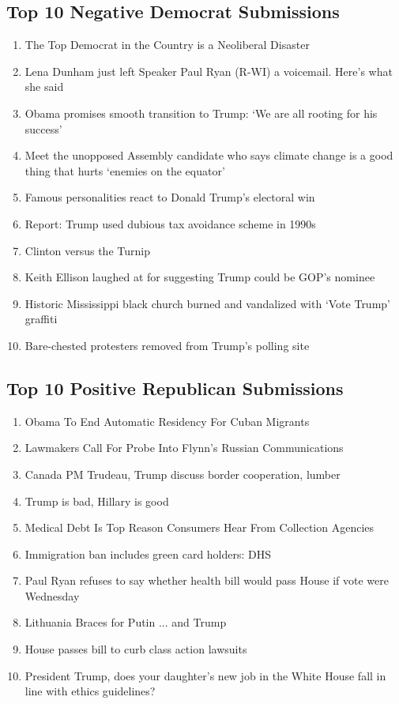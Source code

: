 \documentclass[12pt]{article}
\begin{document}
\subsection{Top 10 Negative Democrat Submissions}

{\scriptsize
\begin{enumerate}
        \item The Top Democrat in the Country is a Neoliberal Disaster
        \item Lena Dunham just left Speaker Paul Ryan (R-WI) a voicemail. Here's what she said
        \item Obama promises smooth transition to Trump: `We are all rooting for his success'
        \item Meet the unopposed Assembly candidate who says climate change is a good thing that hurts `enemies on the equator'
        \item Famous personalities react to Donald Trump's electoral win
        \item Report: Trump used dubious tax avoidance scheme in 1990s
        \item Clinton versus the Turnip
        \item Keith Ellison laughed at for suggesting Trump could be GOP's nominee
        \item Historic Mississippi black church burned and vandalized with `Vote Trump' graffiti
        \item Bare-chested protesters removed from Trump's polling site
\end{enumerate}
}

\subsection{Top 10 Positive Republican Submissions}

{\scriptsize
\begin{enumerate}
        \item Obama To End Automatic Residency For Cuban Migrants
        \item Lawmakers Call For Probe Into Flynn's Russian Communications
        \item Canada PM Trudeau, Trump discuss border cooperation, lumber
        \item Trump is bad, Hillary is good
        \item Medical Debt Is Top Reason Consumers Hear From Collection Agencies
        \item Immigration ban includes green card holders: DHS
        \item Paul Ryan refuses to say whether health bill would pass House if vote were Wednesday
        \item Lithuania Braces for Putin ... and Trump
        \item House passes bill to curb class action lawsuits
        \item President Trump, does your daughter's new job in the White House fall in line with ethics guidelines?
\end{enumerate}
}
\end{document}
